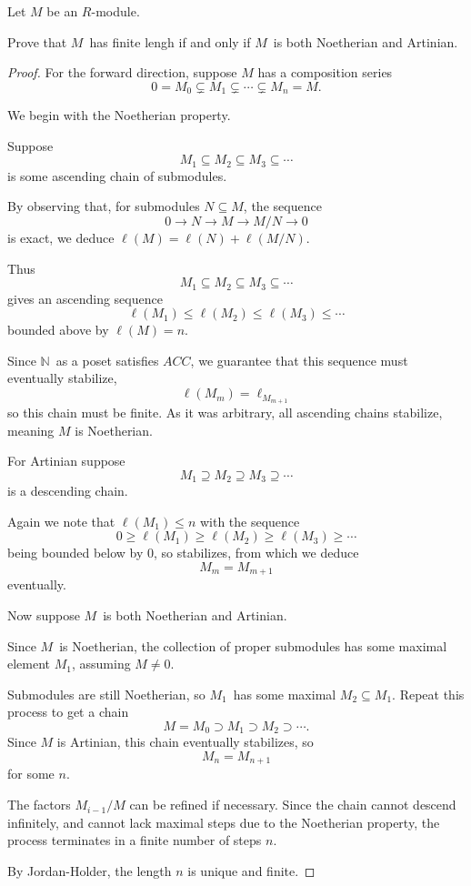 \documentclass[11pt]{article}
\begin{document}
\begin{prob}
    Let $M$ be an $R$-module. 

    Prove that $M$ has finite lengh if and only if 
    $M$ is both Noetherian and Artinian. 
\end{prob}
\begin{proof}
    For the forward direction, suppose 
    $M$ has a composition series 
    \[
        0 = M_0 \subsetneq M_1 \subsetneq \cdots 
        \subsetneq M_n = M.
    \]

    We begin with the Noetherian property. 

    Suppose 
    \[
        M_1 \subseteq M_2 \subseteq M_3 \subseteq \cdots 
    \]
    is some ascending chain of submodules. 

    By observing that, for submodules $N \subseteq M$, 
    the sequence 
    \[
        0 \to N \to M \to M/N \to 0 
    \]
    is exact, we deduce $\ell(M) = \ell(N) + \ell(M/N)$.  

    Thus 
    \[
        M_1 \subseteq M_2 \subseteq M_3 \subseteq \cdots 
    \]
    gives an ascending sequence 
    \[
        \ell(M_1) \leq \ell(M_2) \leq \ell(M_3) \leq 
        \cdots 
    \]
    bounded above by $\ell(M) = n$. 

    Since $\mathbb N$ as a poset satisfies $ACC$, 
    we guarantee that this sequence must eventually stabilize, 
    \[
        \ell(M_{m}) = \ell_{M_{m+1}}
    \]
    so this chain must be finite. As it was arbitrary, all 
    ascending chains stabilize, meaning 
    $M$ is Noetherian. 

    For Artinian suppose 
    \[
        M_1 \supseteq M_2 \supseteq M_3 \supseteq \cdots 
    \]
    is a descending chain. 

    Again we note that $\ell(M_1) \leq n$ 
    with the sequence
    \[
        0 \geq \ell(M_1) \geq \ell(M_2) 
        \geq \ell(M_3) \geq \cdots 
    \]
    being bounded below by $0$, so 
    stabilizes, from 
    which we deduce 
    \[
        M_{m} = M_{m+1}
    \]
    eventually. 

    Now suppose $M$ is both Noetherian 
    and Artinian. 

    Since $M$ is Noetherian, 
    the collection of proper submodules 
    has some maximal element $M_1$, assuming $M \neq 0$. 

    Submodules are still Noetherian, so 
    $M_1$ has some maximal $M_2 \subseteq M_1$. 
    Repeat this process to get a chain 
    \[
        M = M_0 \supset M_1 \supset M_2 \supset \cdots. 
    \]
    Since $M$ is Artinian, this chain 
    eventually stabilizes, so 
    \[
        M_n = M_{n+1}
    \]
    for some $n$. 

    The factors $M_{i-1}/M$ can be refined if necessary. 
    Since the chain cannot descend infinitely, and 
    cannot lack maximal steps due to the Noetherian 
    property, the process terminates 
    in a finite number of steps $n$. 

    By Jordan-Holder, the length $n$ is unique and finite. 
\end{proof}
\end{document}
